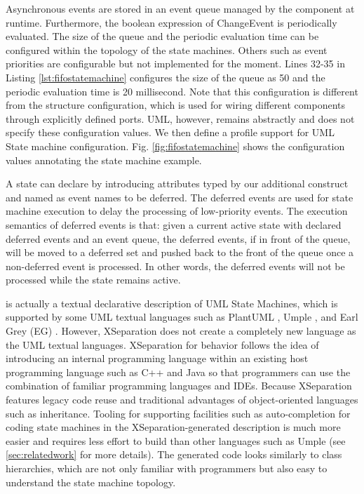 \vskip 0.1cm
\noindent
{} 
Asynchronous events are stored in an event queue managed by the component at runtime.
Furthermore, the boolean expression of ChangeEvent is periodically evaluated.
The size of the queue and the periodic evaluation time can be configured within the topology of the state machines.
Others such as event priorities are configurable but not implemented for the moment.
Lines 32-35 in Listing \ref{lst:fifostatemachine} configures the size of the queue as 50 and the periodic evaluation time is 20 millisecond.
Note that this configuration is different from the structure configuration, which is used for wiring different components through explicitly defined ports.
UML, however, remains abstractly and does not specify these configuration values.
We then define a profile support for UML State machine configuration.
Fig. \ref{fig:fifostatemachine} shows the configuration values annotating the state machine example. 

\vskip 0.1cm
\noindent
{}
A state can declare  by introducing attributes typed by our additional construct  and named as event names to be deferred.
The deferred events are used for state machine execution to delay the processing of low-priority events.
The execution semantics of deferred events is that: given a current active state with declared deferred events and an event queue, the deferred events, if in front of the queue, will be moved to a deferred set and pushed back to the front of the queue once a non-deferred event is processed.
In other words, the deferred events will not be processed while the state remains active.

\vskip 0.1cm
\noindent
{} 
 is actually a textual declarative description of UML State Machines, which is supported by some UML textual languages such as PlantUML \cite{plantuml}, Umple \cite{lethbridge2010umplification}, and Earl Grey (EG) \cite{mazanec2012general}.
However, XSeparation does not create a completely new language as the UML textual languages. 
XSeparation for behavior follows the idea of introducing an internal programming language within an existing host programming language such as C++ and Java \cite{Hinkel2015} so that programmers can use the combination of familiar programming languages and IDEs.
Because XSeparation features legacy code reuse and traditional advantages of object-oriented languages such as inheritance.
Tooling for supporting facilities such as auto-completion for coding state machines in the XSeparation-generated description is much more easier and requires less effort to build than other languages such as Umple (see \ref{sec:relatedwork} for more details). 
The generated code looks similarly to class hierarchies, which are not only familiar with programmers but also easy to understand the state machine topology. 

